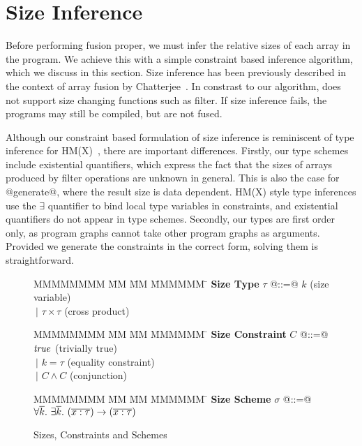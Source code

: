 \section{Size Inference}
Before performing fusion proper, we must infer the relative sizes of each array in the program. We achieve this with a simple constraint based inference algorithm, which we discuss in this section. Size inference has been previously described in the context of array fusion by Chatterjee~\cite{chatterjee1991size}. In constrast to our algorithm, \cite{chatterjee1991size} does not support size changing functions such as filter.
If size inference fails, the programs may still be compiled, but are not fused.

Although our constraint based formulation of size inference is reminiscent of type inference for HM(X)~\cite{odersky1999type}, there are important differences. Firstly, our type schemes include existential quantifiers, which express the fact that the sizes of arrays produced by filter operations are unknown in general. This is also the case for @generate@, where the result size is data dependent. HM(X) style type inferences use the $\exists$ quantifier to bind local type variables in constraints, and existential quantifiers do not appear in type schemes. Secondly, our types are first order only, as program graphs cannot take other program graphs as arguments. Provided we generate the constraints in the correct form, solving them is straightforward.


\begin{figure}
\begin{tabbing}
MMMMMMMM \= MM  \= MM \= MMMMMM \= \kill
\textbf{Size Type}
\> $\tau$   \> @::=@  \> $k$                  \> (size variable)       \\
\>          \> $~|$   \> $\tau \times \tau$   \> (cross product)
\end{tabbing}

\begin{tabbing}
MMMMMMMM \= MM  \= MM \= MMMMMM \= \kill
\textbf{Size Constraint}
\> $C$      \> @::=@  \> $\mathit{true}$               \> (trivially true)      \\
\>          \> $~|$   \> $k = \tau$           \> (equality constraint) \\
\>          \> $~|$   \> $C \wedge C$         \> (conjunction)
\end{tabbing}

\begin{tabbing}
MMMMMMMM \= MM  \= MM \= MMMMMM \= \kill
\textbf{Size Scheme}
\> $\sigma$ \> @::=@  
        \> $\forall \overline{k}.~ \exists \overline{k}.~ (\overline{ x : \tau }) \to (\overline{x : \tau})$
\end{tabbing}

\caption{Sizes, Constraints and Schemes}
\label{f:constraints}
\end{figure}


